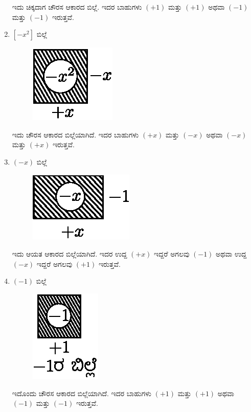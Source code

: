 \begin{enumerate}
ಇದು ಚಿಕ್ಕದಾಗ ಚೌರಸ ಆಕಾರದ ಬಿಲ್ಲೆ. ಇದರ ಬಾಹುಗಳು $(+1)$ ಮತ್ತು $(+1)$ ಅಥವಾ $(-1)$ ಮತ್ತು $(-1)$ ಇರುತ್ತವೆ.

\item $[-x^2]$ ಬಿಲ್ಲೆ  
\begin{figure}[H]
\centering
\includegraphics[scale=0.8]{src/figure/chap3/fig3-4d.eps}
\end{figure}

ಇದು ಚೌರಸ ಆಕಾರದ ಬಿಲ್ಲೆಯಾಗಿದೆ. ಇದರ ಬಾಹುಗಳು $(+x)$ ಮತ್ತು $(-x)$ ಅಥವಾ $(-x)$ ಮತ್ತು $(+x)$ ಇರುತ್ತವೆ.

\item $(-x)$ ಬಿಲ್ಲೆ 
\begin{figure}[H]
\centering
\includegraphics[scale=0.8]{src/figure/chap3/fig3-4e.eps}
\end{figure}

ಇದು ಆಯತ ಆಕಾರದ ಬಿಲ್ಲೆಯಾಗಿದೆ. ಇದರ ಉದ್ದ $(+x)$ ಇದ್ದರೆ ಅಗಲವು $(-1)$ ಅಥವಾ ಉದ್ದ $(-x)$ ಇದ್ದರೆ ಅಗಲವು $(+1)$ ಇರುತ್ತವೆ.

\item $(-1)$ ಬಿಲ್ಲೆ 
\begin{figure}[H]
\centering
\includegraphics[scale=0.8]{src/figure/chap3/fig3-4f.eps}
\end{figure}

ಇದೊಂದು ಚೌರಸ ಆಕಾರದ ಬಿಲ್ಲೆಯಾಗಿದೆ. ಇದರ ಬಾಹುಗಳು $(+1)$ ಮತ್ತು $(+1)$ ಅಥವಾ $(-1)$ ಮತ್ತು $(-1)$ ಇರುತ್ತವೆ. 
\end{enumerate}

